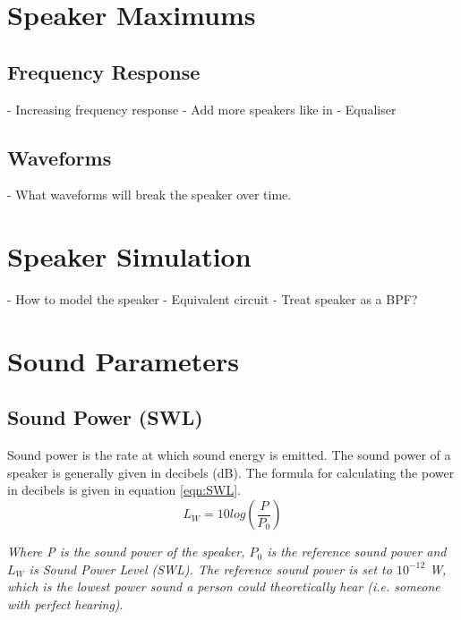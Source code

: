 \documentclass[12pt, a4paper]{article}
\begin{document}
	\section{Speaker Maximums}
	\subsection{Frequency Response}
		- Increasing frequency response
	- Add more speakers like in \cite{howSpeaker}
	- Equaliser
	\subsection{Waveforms}
	- What waveforms will break the speaker over time.		
	\section{Speaker Simulation}
	- How to model the speaker - Equivalent circuit
	- Treat speaker as a BPF?
	\section{Sound Parameters}
	\subsection{Sound Power (SWL)}
	Sound power is the rate at which sound energy is emitted. The sound power of a speaker is generally given in decibels (dB). The formula for calculating the power in decibels is given in equation \ref{eqn:SWL}. \cite{audioParameters}\cite{soundPower}
	\begin{equation}
		\label{eqn:SWL}
		L_W = 10log\left(\frac{P}{P_0}\right)
	\end{equation}
	\begin{center}
		\textit{Where P is the sound power of the speaker, $P_0$ is the reference sound power and $L_W$ is Sound Power Level (SWL). The reference sound power is set to $10^{-12}$ W, which is the lowest power sound a person could theoretically hear (i.e. someone with perfect hearing)}. 	 %
	\end{center}
\end{document}
